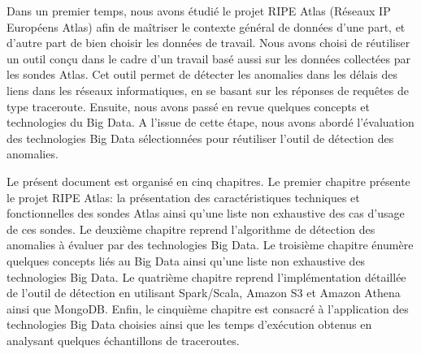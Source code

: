 
Dans un premier temps, nous avons étudié le projet RIPE  Atlas (Réseaux IP Européens Atlas) afin de maîtriser le contexte général de données  d'une part, et d'autre part de bien choisir les données de travail. Nous avons choisi de réutiliser un outil conçu dans le cadre d'un travail basé aussi sur les données collectées par les sondes Atlas. Cet outil permet de détecter les anomalies dans les délais des liens dans les réseaux informatiques,  en se basant sur les réponses de requêtes de type traceroute. 
 Ensuite, nous avons passé en revue quelques concepts  et   technologies du Big Data.
  A l'issue de cette étape, nous avons abordé l'évaluation des technologies Big Data sélectionnées pour
    réutiliser l'outil de  détection des anomalies.



Le présent document est organisé en cinq chapitres. Le premier chapitre présente le projet RIPE Atlas: la présentation des caractéristiques techniques et fonctionnelles des sondes Atlas ainsi qu'une liste non exhaustive des cas d'usage de ces sondes. Le deuxième chapitre reprend l'algorithme de  détection des anomalies  à évaluer par des technologies Big Data.
Le troisième chapitre énumère quelques concepts liés au Big Data ainsi qu'une liste non exhaustive des technologies Big Data.
Le quatrième chapitre reprend l'implémentation détaillée de l'outil de détection en utilisant  Spark/Scala, Amazon S3 et Amazon Athena ainsi que MongoDB. Enfin, le cinquième  chapitre est consacré à l'application des technologies Big Data  choisies
ainsi que les temps d'exécution obtenus en analysant quelques échantillons de traceroutes.


